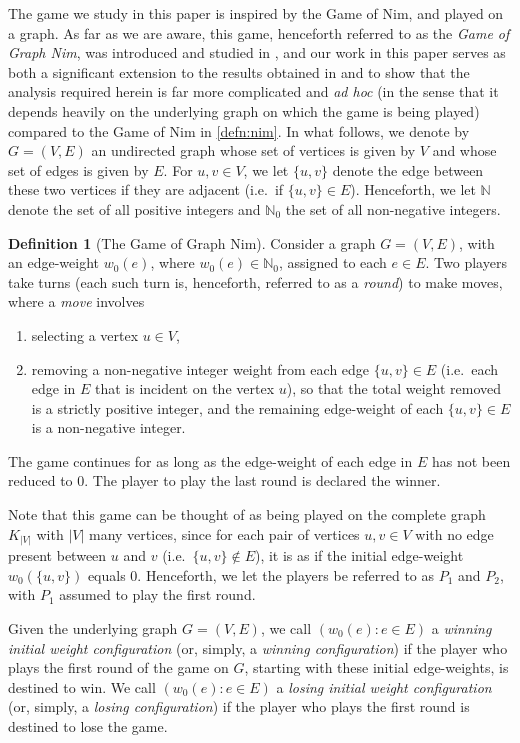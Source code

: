 \documentclass[11pt,reqno]{amsart}
\theoremstyle{definition}
\newtheorem{defn}[theorem]{Definition}
\theoremstyle{definition}
\begin{document}
The game we study in this paper is inspired by the Game of Nim, and played on a graph. As far as we are aware, this game, henceforth referred to as the \emph{Game of Graph Nim}, was introduced and studied in \cite{williams2017combinatorial}, and our work in this paper serves as both a significant extension to the results obtained in \cite{williams2017combinatorial} and to show that the analysis required herein is far more complicated and \emph{ad hoc} (in the sense that it depends heavily on the underlying graph on which the game is being played) compared to the Game of Nim in \ref{defn:nim}. In what follows, we denote by $G=(V,E)$ an undirected graph whose set of vertices is given by $V$ and whose set of edges is given by $E$. For $u, v \in V$, we let $\{u,v\}$ denote the edge between these two vertices if they are adjacent (i.e.\ if $\{u,v\} \in E$). Henceforth, we let $\mathbb{N}$ denote the set of all positive integers and $\mathbb{N}_{0}$ the set of all non-negative integers.
\begin{defn}[The Game of Graph Nim]\label{defn:graph_nim}
Consider a graph $G=(V,E)$, with an edge-weight $w_{0}(e)$, where $w_{0}(e) \in \mathbb{N}_{0}$, assigned to each $e \in E$. Two players take turns (each such turn is, henceforth, referred to as a \emph{round}) to make moves, where a \emph{move} involves 
\begin{enumerate}
\item selecting a vertex $u \in V$,
\item removing a non-negative integer weight from each edge $\{u,v\} \in E$ (i.e.\ each edge in $E$ that is incident on the vertex $u$), so that the total weight removed is a strictly positive integer, and the remaining edge-weight of each $\{u,v\} \in E$ is a non-negative integer.
\end{enumerate}
The game continues for as long as the edge-weight of each edge in $E$ has not been reduced to $0$. The player to play the last round is declared the winner.
\end{defn}
Note that this game can be thought of as being played on the complete graph $K_{|V|}$ with $|V|$ many vertices, since for each pair of vertices $u,v \in V$ with no edge present between $u$ and $v$ (i.e.\ $\{u,v\} \notin E$), it is as if the initial edge-weight $w_{0}(\{u,v\})$ equals $0$. Henceforth, we let the players be referred to as $P_{1}$ and $P_{2}$, with $P_{1}$ assumed to play the first round.

Given the underlying graph $G=(V,E)$, we call $\left(w_{0}(e): e \in E\right)$ a \emph{winning initial weight configuration} (or, simply, a \emph{winning configuration}) if the player who plays the first round of the game on $G$, starting with these initial edge-weights, is destined to win. We call $\left(w_{0}(e): e \in E\right)$ a \emph{losing initial weight configuration} (or, simply, a \emph{losing configuration}) if the player who plays the first round is destined to lose the game. 
\end{document}
